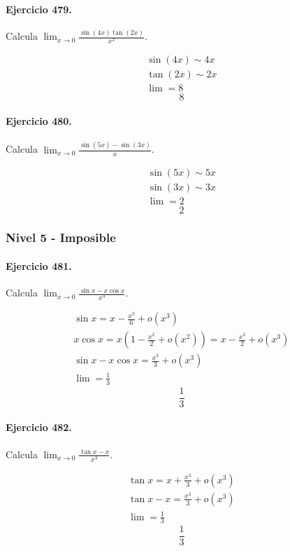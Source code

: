 \documentclass[11pt,a4paper]{article}
\begin{document}
\paragraph{Ejercicio 479.} Calcula $\displaystyle\lim_{x\to0}\frac{\sin(4x)\tan(2x)}{x^2}$.

\[
\begin{aligned}
\sin(4x)\sim 4x\\
\tan(2x)\sim 2x\\
\lim=8
\end{aligned}
\]
\[\boxed{8}\]


\paragraph{Ejercicio 480.} Calcula $\displaystyle\lim_{x\to0}\frac{\sin(5x)-\sin(3x)}{x}$.

\[
\begin{aligned}
\sin(5x)\sim 5x\\
\sin(3x)\sim 3x\\
\lim=2
\end{aligned}
\]
\[\boxed{2}\]


\newpage

\subsubsection*{Nivel 5 - Imposible}

\paragraph{Ejercicio 481.} Calcula $\displaystyle \lim_{x\to0}\frac{\sin x-x\cos x}{x^3}$.

\[
\begin{aligned}
\sin x=x-\frac{x^3}{6}+o(x^3)\\
x\cos x=x\left(1-\frac{x^2}{2}+o(x^2)\right)=x-\frac{x^3}{2}+o(x^3)\\
\sin x-x\cos x=\frac{x^3}{3}+o(x^3)\\
\lim=\frac13
\end{aligned}
\]
\[\boxed{\frac13}\]


\paragraph{Ejercicio 482.} Calcula $\displaystyle \lim_{x\to0}\frac{\tan x-x}{x^3}$.

\[
\begin{aligned}
\tan x=x+\frac{x^3}{3}+o(x^3)\\
\tan x-x=\frac{x^3}{3}+o(x^3)\\
\lim=\frac13
\end{aligned}
\]
\[\boxed{\frac13}\]
\end{document}
